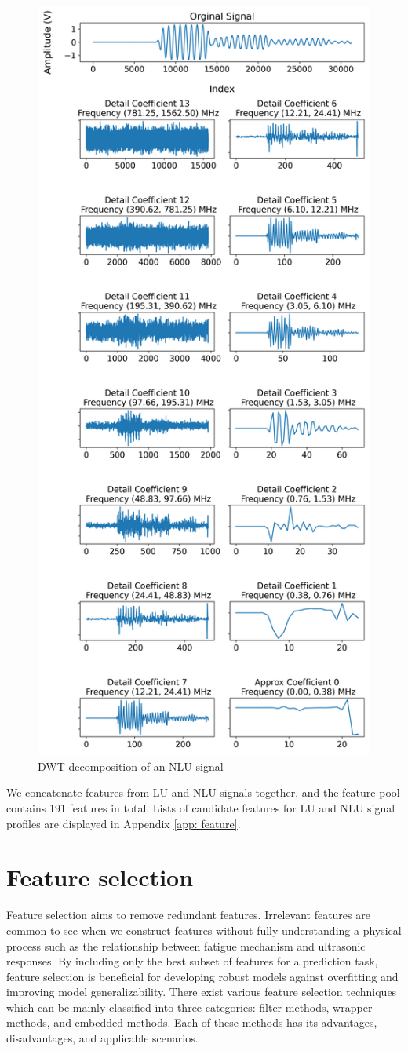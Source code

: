 \begin{figure}[tb]
    \centering
    \includegraphics[height=\linewidth]{fig/dwt_decomposition.png}
    \caption{DWT decomposition of an NLU signal}
    \label{fig: dwt decomposition}
\end{figure}

We concatenate features from LU and NLU signals together, and the feature pool contains 191 features in total. Lists of candidate features for LU and NLU signal profiles are displayed in Appendix \ref{app: feature}.

\section{Feature selection}
Feature selection aims to remove redundant features. Irrelevant features are common to see when we construct features without fully understanding a physical process such as the relationship between fatigue mechanism and ultrasonic responses. By including only the best subset of features for a prediction task, feature selection is beneficial for developing robust models against overfitting and improving model generalizability. There exist various feature selection techniques which can be mainly classified into three categories: filter methods, wrapper methods, and embedded methods. Each of these methods has its advantages, disadvantages, and applicable scenarios.

